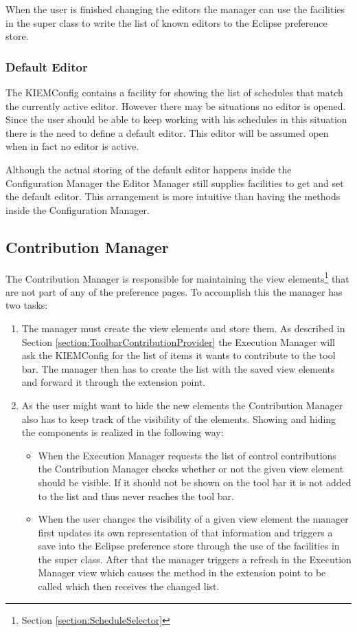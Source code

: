 When the user is finished changing the editors the manager can use the facilities in the super class to
write the list of known editors to the Eclipse preference store.


\subsubsection{Default Editor}
\label{section:DefaultEditor}
The \ac{KIEMConfig} contains a facility for showing the list of schedules that match the currently active
editor. However there may be situations no editor is opened. Since the user should be able to keep working
with his schedules in this situation there is the need to define a default editor. This editor will be assumed open 
when in fact no editor is active.

Although the actual storing of the default editor happens inside the Configuration Manager the Editor Manager
still supplies facilities to get and set the default editor. This arrangement is more intuitive than having
the methods inside the Configuration Manager.


\subsection{Contribution Manager}
\label{section:ContributionManager}
The Contribution Manager is responsible for maintaining the view elements\footnote{Section \ref{section:ScheduleSelector}}
that are not part of any of the preference pages. To accomplish this the manager has two tasks:
\begin{enumerate}
 \item The manager must create the view elements and store them. As described in Section 
\ref{section:ToolbarContributionProvider} the Execution Manager will ask the \ac{KIEMConfig}
for the list of items it wants to contribute to the tool bar. The manager then has to 
create the list with the saved view elements and forward it through the extension point.
 \item As the user might want to hide the new elements the Contribution Manager also has to 
keep track of the visibility of the elements. Showing and hiding the components is realized
in the following way:
\begin{itemize}
 \item When the Execution Manager requests the list of control contributions the Contribution Manager
checks whether or not the given view element should be visible. If it should not be shown on the tool bar
it is not added to the list and thus never reaches the tool bar.
 \item When the user changes the visibility of a given view element the manager first updates its own
representation of that information and triggers a save into the Eclipse preference store through the use
of the facilities in the super class. After that the manager triggers a refresh in the Execution Manager
view which causes the method in the extension point to be called which then receives the changed list.
\end{itemize}
\end{enumerate}


